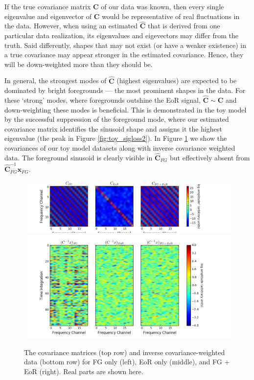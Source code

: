 \documentclass[preprint2,numberedappendix,tighten]{aastex6}  %
\begin{document}
If the true covariance matrix $\textbf{C}$ of our data was known, then every single eigenvalue and eigenvector of $\textbf{C}$ would be 
representative of real fluctuations in the data. However, when using an estimated $\hat{\textbf{C}}$ that is derived from one 
particular data realization, its eigenvalues and eigevectors may differ from the truth. Said differently, shapes that may not exist (or have a 
weaker existence) in a true covariance may appear stronger in the estimated covariance. Hence, they will be down-weighted 
more than they should be.

In general, the strongest modes of $\hat{\textbf{C}}$ (highest eigenvalues) are expected to be dominated by bright foregrounds 
--- the most prominent shapes in the data. For these `strong' modes, where foregrounds outshine the EoR signal, $
\hat{\textbf{C}} \sim \textbf{C}$ and down-weighting these modes is beneficial. This is demonstrated in the toy model by the 
successful suppression of the foreground mode, where our estimated covariance matrix identifies the sinusoid shape and 
assigns it the highest eigenvalue (the peak in Figure \ref{fig:toy_sigloss2}). In Figure \ref{fig:toy_sigloss12} we show the 
covariances of our toy model datasets along with inverse covariance weighted data. The foreground sinusoid is clearly visible in 
$\hat{\textbf{C}}_{FG}$ but effectively absent from $\hat{\textbf{C}}^{-1}_{FG}\textbf{x}_{FG}$.

\begin{figure}
	\centering
	\includegraphics[trim={1.5cm 0.1cm 3.5cm 0.1cm},clip,width=\columnwidth]{plots/toy_sigloss12.png}
	\includegraphics[trim={1.5cm 0.1cm 3.5cm 0.1cm},clip,width=\columnwidth]{plots/toy_sigloss13.png}
	\caption{The covariance matrices (top row) and inverse covariance-weighted data (bottom row) for FG only (left), EoR only 
(middle), and FG + EoR (right). Real parts are shown here.}
	\label{fig:toy_sigloss12}
\end{figure}
\end{document}
